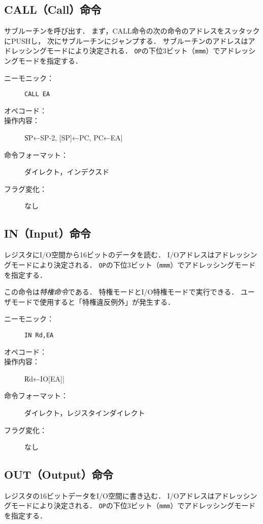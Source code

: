 \subsection{CALL（Call）命令}
サブルーチンを呼び出す．
まず，CALL命令の次の命令のアドレスをスッタックにPUSHし，
次にサブルーチンにジャンプする．
サブルーチンのアドレスはアドレッシングモードにより決定される．
\texttt{OP}の下位3ビット（\texttt{mmm}）でアドレッシングモードを指定する．

\begin{description}
\item[ニーモニック：] \texttt{CALL EA}
\item[オペコード：] 
\item[操作内容：] \|SP←SP-2, [SP]←PC, PC←EA|
\item[命令フォーマット：] ダイレクト，インデクスド
\item[フラグ変化：] なし
\end{description}

\subsection{IN（Input）命令}
レジスタにI/O空間から16ビットのデータを読む．
I/Oアドレスはアドレッシングモードにより決定される．
\texttt{OP}の下位3ビット（\texttt{mmm}）でアドレッシングモードを指定する．

この命令は\emph{特権命令}である．
特権モードとI/O特権モードで実行できる．
ユーザモードで使用すると「特権違反例外」が発生する．

\begin{description}
\item[ニーモニック：] \texttt{IN Rd,EA}
\item[オペコード：] 
\item[操作内容：] \|Rd←IO[EA]|
\item[命令フォーマット：] ダイレクト，レジスタインダイレクト
\item[フラグ変化：] なし
\end{description}

\subsection{OUT（Output）命令}
レジスタの16ビットデータをI/O空間に書き込む．
I/Oアドレスはアドレッシングモードにより決定される．
\texttt{OP}の下位3ビット（\texttt{mmm}）でアドレッシングモードを指定する．

